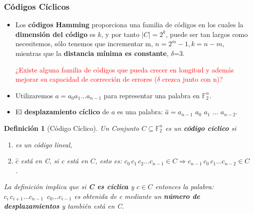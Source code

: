\documentclass{beamer}
\theoremstyle{plain}
\newtheorem{definicion} [Definicion]{Definición}
\theoremstyle{example}
\theoremstyle{example}
\begin{document}
\begin{frame}  \frametitle{Códigos Cíclicos}\footnotesize

\begin{itemize} 

\item  Los \textbf{códigos Hamming} proporciona una familia de códigos en los cuales la \textbf{dimensión del código} es $k$, y por tanto $|C| = 2^k$, puede ser tan largos como necesitemos, sólo tenemos que incrementar m, $n=2^m-1, k=n-m$, mientras que la \textbf{distancia mínima es constante}, $\delta$=3.

\begin{center}
 \textcolor{red}{¿Existe alguna familia de códigos que pueda crecer en longitud y además mejorar su capacidad de corrección de errores ($\delta$ crezca junto con n)?}
\end{center}

\item  Utilizaremos $a= a_0a_1\ldots a_{n-1}$ para representar una palabra en $\mathbb{F}_2^n$.

\item El \textbf{desplazamiento cíclico} de $a$ es una palabra: $\hat{a}=a_{n-1}$ $a_0$ $a_1$ $\ldots$ $a_{n-2}.$
\end{itemize} 

\begin{definicion}[Código Cíclico]

Un Conjunto $C\subseteq \mathbb{F}_2^n$ es un \textbf{código cíclico} si
\begin{enumerate}
\item es un código lineal,
\item $\hat{c}$ está en C, si c está en $C$, esto es: $c_0\,c_1\,c_2 \ldots c_{n-1} \in C	\Rightarrow c_{n-1}\,c_0\,c_1 \ldots c_{n-2} \in C$.
\end{enumerate}

La definición implica que si \textbf{C es cíclica} y $c\in C$ entonces la palabra: $c_i\,c_{i+1} \ldots c_{n-1}$ $\,c_0 \ldots c_{i-1}$ es obtenida de c mediante un \textbf{número de desplazamientos} y también está en C.
\end{definicion}

\end{frame} 
\end{document}
